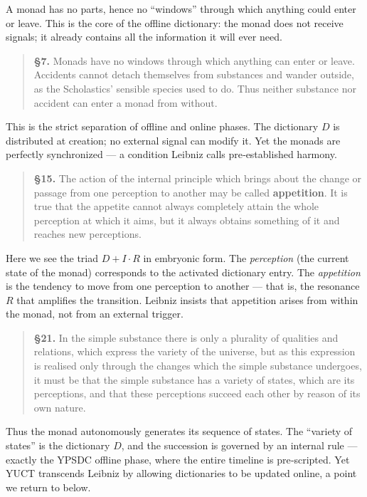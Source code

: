 \documentclass[12pt,a4paper]{article}
\begin{document}
	A monad has no parts, hence no “windows” through which anything could enter or leave. This is the core of the offline dictionary: the monad does not receive signals; it already contains all the information it will ever need.
	
	\begin{quote}
		\textbf{§7.} Monads have no windows through which anything can enter or leave. Accidents cannot detach themselves from substances and wander outside, as the Scholastics' sensible species used to do. Thus neither substance nor accident can enter a monad from without.
	\end{quote}
	
	This is the strict separation of offline and online phases. The dictionary \(D\) is distributed at creation; no external signal can modify it. Yet the monads are perfectly synchronized — a condition Leibniz calls pre‑established harmony.
	
	\begin{quote}
		\textbf{§15.} The action of the internal principle which brings about the change or passage from one perception to another may be called \textbf{appetition}. It is true that the appetite cannot always completely attain the whole perception at which it aims, but it always obtains something of it and reaches new perceptions.
	\end{quote}
	
	Here we see the triad \(D+I\cdot R\) in embryonic form. The \emph{perception} (the current state of the monad) corresponds to the activated dictionary entry. The \emph{appetition} is the tendency to move from one perception to another — that is, the resonance \(R\) that amplifies the transition. Leibniz insists that appetition arises from within the monad, not from an external trigger.
	
	\begin{quote}
		\textbf{§21.} In the simple substance there is only a plurality of qualities and relations, which express the variety of the universe, but as this expression is realised only through the changes which the simple substance undergoes, it must be that the simple substance has a variety of states, which are its perceptions, and that these perceptions succeed each other by reason of its own nature.
	\end{quote}
	
	Thus the monad autonomously generates its sequence of states. The “variety of states” is the dictionary \(D\), and the succession is governed by an internal rule — exactly the YPSDC offline phase, where the entire timeline is pre‑scripted. Yet YUCT transcends Leibniz by allowing dictionaries to be updated online, a point we return to below.
	
\end{document}
